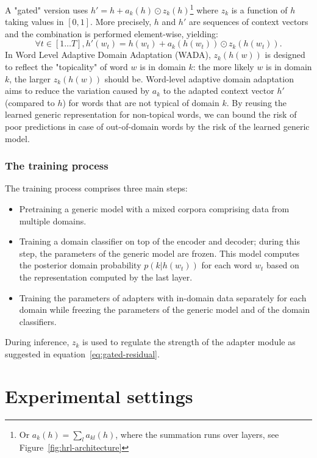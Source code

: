 \documentclass[11pt,a4paper]{article}
\begin{document}
 A "gated" version uses $h' = h + a_k(h) \odot{} z_k(h)$\footnote{Or $a_k(h) = \sum_{l} a_{kl}(h)$, where the summation runs over layers, see Figure~\ref{fig:hrl-architecture}} where $z_k$ is a function of $h$ taking values in $[0,1]$. More precisely, $h$ and $h'$ are sequences of context vectors and the combination is performed element-wise, yielding:
\begin{equation}
   \forall t \in [1 \dots{} T], h'(w_t) = h(w_t) + a_k(h(w_t)) \odot{} z_k(h(w_t)). \label{eq:gated-residual}
\end{equation}
In Word Level Adaptive Domain Adaptation (WADA), $z_k(h(w))$ is designed to reflect the "topicality" of  word $w$ is in domain $k$: the more likely $w$ is in domain $k$, the larger $z_k(h(w))$ should be. Word-level adaptive domain adaptation aims to reduce the variation caused by $a_k$ to the adapted context vector $h'$ (compared to $h$) for words that are not typical of domain $k$. By reusing the learned generic representation for non-topical words, we can bound the risk of poor predictions in case of out-of-domain words by the risk of the learned generic model.
\subsubsection{The training process \label{sssec:train}}
The training process comprises three main steps:
\begin{itemize}
	\item Pretraining a generic model with a mixed corpora comprising data from multiple domains.
	\item Training a domain classifier on top of the encoder and decoder; during this step, the parameters of the generic model are frozen. This model computes the posterior domain probability $p(k|h(w_t))$ for each word $w_t$ based on the representation computed by the last layer.
	\item Training the parameters of adapters with in-domain data separately for each domain while freezing the parameters of the generic model and of the domain classifiers.
\end{itemize}
During inference, $z_k$ is used to regulate the strength of the adapter module as suggested in equation~\ref{eq:gated-residual}.
\section{Experimental settings \label{sec:exp}}
\end{document}
